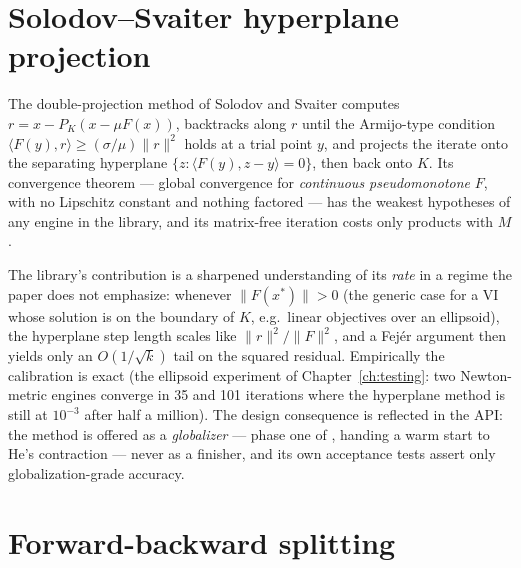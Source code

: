 \section{Solodov--Svaiter hyperplane projection}
\label{sec:a-ss}

The double-projection method of Solodov and Svaiter \cite{solodov1999}
computes $r = x - P_K(x - \mu F(x))$, backtracks along $r$ until the
Armijo-type condition $\langle F(y), r\rangle \ge (\sigma/\mu)\|r\|^2$
holds at a trial point $y$, and projects the iterate onto the separating
hyperplane $\{z : \langle F(y), z - y\rangle = 0\}$, then back onto $K$.
Its convergence theorem --- global convergence for \emph{continuous
pseudomonotone} $F$, with no Lipschitz constant and nothing factored ---
has the weakest hypotheses of any engine in the library, and its
matrix-free iteration costs only products with $M$.

The library's contribution is a sharpened understanding of its \emph{rate}
in a regime the paper does not emphasize: whenever $\|F(x^\ast)\| > 0$ (the
generic case for a VI whose solution is on the boundary of $K$, e.g.\
linear objectives over an ellipsoid), the hyperplane step length scales
like $\|r\|^2 / \|F\|^2$, and a Fej\'er argument then yields only an
$O(1/\sqrt{k})$ tail on the squared residual. Empirically the calibration
is exact (the ellipsoid experiment of Chapter~\ref{ch:testing}: two Newton-
metric engines converge in 35 and 101 iterations where the hyperplane
method is still at $10^{-3}$ after half a million). The design consequence
is reflected in the API: the method is offered as a \emph{globalizer} ---
phase one of \code{chainedSolodovHe}, handing a warm start to He's
contraction --- never as a finisher, and its own acceptance tests assert
only globalization-grade accuracy.

\section{Forward-backward splitting}
\label{sec:a-fbs}

